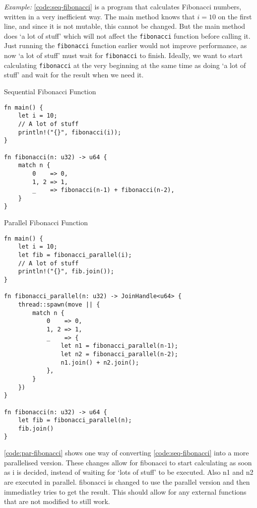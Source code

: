 \documentclass[conference]{IEEEtran}
\begin{document}
\textit{Example:}
\autoref{code:seq-fibonacci} is a program that calculates Fibonacci numbers, written in a very inefficient way. The main method knows that $i = 10$ on the first line, and since it is not mutable, this cannot be changed. But the main method does `a lot of stuff' which will not affect the \texttt{fibonacci} function before calling it. Just running the \texttt{fibonacci} function earlier would not improve performance, as now `a lot of stuff' must wait for \texttt{fibonacci} to finish. Ideally, we want to start calculating \texttt{fibonacci} at the very beginning at the same time as doing `a lot of stuff' and wait for the result when we need it.

\begin{algorithm}
\caption{Sequential Fibonacci Function}
\label{code:seq-fibonacci}
\begin{verbatim}
fn main() {
    let i = 10;
    // A lot of stuff
    println!("{}", fibonacci(i));
}

fn fibonacci(n: u32) -> u64 {
    match n {
        0    => 0,
        1, 2 => 1,
        _    => fibonacci(n-1) + fibonacci(n-2),
    }
}
\end{verbatim}
\end{algorithm}

\begin{algorithm}
\caption{Parallel Fibonacci Function}
\label{code:par-fibonacci}
\begin{verbatim}
fn main() {
    let i = 10;
    let fib = fibonacci_parallel(i);
    // A lot of stuff
    println!("{}", fib.join());
}

fn fibonacci_parallel(n: u32) -> JoinHandle<u64> {
    thread::spawn(move || {
        match n {
            0    => 0,
            1, 2 => 1,
            _    => {
                let n1 = fibonacci_parallel(n-1);
                let n2 = fibonacci_parallel(n-2);
                n1.join() + n2.join();
            },
        }
    })
}

fn fibonacci(n: u32) -> u64 {
    let fib = fibonacci_parallel(n);
    fib.join()
}
\end{verbatim}
\end{algorithm}

\autoref{code:par-fibonacci} shows one way of converting \autoref{code:seq-fibonacci} into a more parallelised version. These changes allow for fibonacci to start calculating as soon as i is decided, instead of waiting for `lots of stuff' to be executed. Also n1 and n2 are executed in parallel. fibonacci is changed to use the parallel version and then immediatley tries to get the result. This should allow for any external functions that are not modified to still work.
\end{document}

